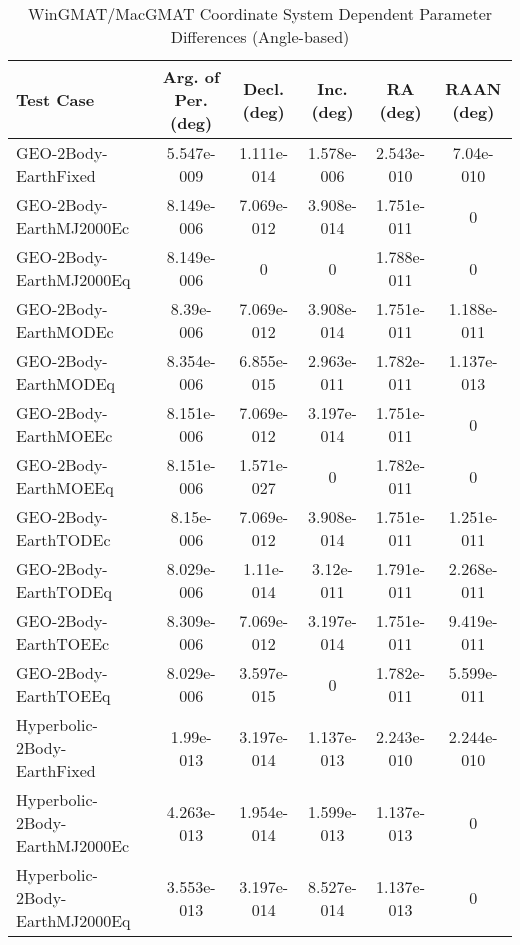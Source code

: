 \begin{table}[htbp!]
\centering
\caption{ WinGMAT/MacGMAT Coordinate System Dependent Parameter Differences (Angle-based)}
      \begin{tabular}{lccccc}
      \hline\hline
          Test Case & Arg. of Per. (deg) & Decl. (deg) & Inc. (deg) & RA (deg) & RAAN (deg) \\
         \hline
         GEO-2Body-EarthFixed & 5.547e-009 & 1.111e-014 & 1.578e-006 & 2.543e-010 & 7.04e-010 \\
         GEO-2Body-EarthMJ2000Ec & 8.149e-006 & 7.069e-012 & 3.908e-014 & 1.751e-011 & 0 \\
         GEO-2Body-EarthMJ2000Eq & 8.149e-006 & 0 & 0 & 1.788e-011 & 0 \\
         GEO-2Body-EarthMODEc & 8.39e-006 & 7.069e-012 & 3.908e-014 & 1.751e-011 & 1.188e-011 \\
         GEO-2Body-EarthMODEq & 8.354e-006 & 6.855e-015 & 2.963e-011 & 1.782e-011 & 1.137e-013 \\
         GEO-2Body-EarthMOEEc & 8.151e-006 & 7.069e-012 & 3.197e-014 & 1.751e-011 & 0 \\
         GEO-2Body-EarthMOEEq & 8.151e-006 & 1.571e-027 & 0 & 1.782e-011 & 0 \\
         GEO-2Body-EarthTODEc & 8.15e-006 & 7.069e-012 & 3.908e-014 & 1.751e-011 & 1.251e-011 \\
         GEO-2Body-EarthTODEq & 8.029e-006 & 1.11e-014 & 3.12e-011 & 1.791e-011 & 2.268e-011 \\
         GEO-2Body-EarthTOEEc & 8.309e-006 & 7.069e-012 & 3.197e-014 & 1.751e-011 & 9.419e-011 \\
         GEO-2Body-EarthTOEEq & 8.029e-006 & 3.597e-015 & 0 & 1.782e-011 & 5.599e-011 \\
         Hyperbolic-2Body-EarthFixed & 1.99e-013 & 3.197e-014 & 1.137e-013 & 2.243e-010 & 2.244e-010 \\
         Hyperbolic-2Body-EarthMJ2000Ec & 4.263e-013 & 1.954e-014 & 1.599e-013 & 1.137e-013 & 0 \\
         Hyperbolic-2Body-EarthMJ2000Eq & 3.553e-013 & 3.197e-014 & 8.527e-014 & 1.137e-013 & 0 \\

\end{tabular}
\end{table}
